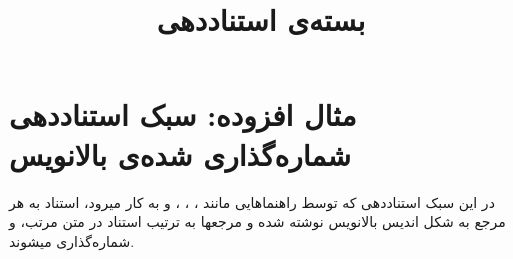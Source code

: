\documentclass[a4paper,10pt]{article}
\begin{document}
\title{بسته‌ی استناددهی }
\author{}
\date{}
\maketitle



\section*{مثال افزوده: سبک استناددهی شماره‌گذاری شده‌ی بالانویس}

در این سبک استناددهی که توسط راهنماهایی مانند ، ، ، و  به کار میرود، استناد به هر مرجع\cite{کمالزاده1388} به شکل اندیس بالانویس نوشته شده و مرجعها به ترتیب استناد در متن\cite{kasper1999,salinger1951} مرتب، و شماره‌گذاری میشوند.






\end{document}
